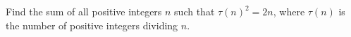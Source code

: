 Find the sum of all positive integers $n$ such that $\tau(n)^2=2n$, where $\tau(n)$ is the number of positive integers dividing $n$.
